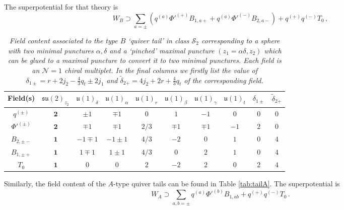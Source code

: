 \documentclass[main.tex]{subfiles}
\begin{document}
The superpotential for that theory is
\begin{equation}
\label{eqn:tailsuperpot}
W_B\supset\sum_{a=\pm}\left(q^{(a)}\Phi'^{(+)}B_{1,a+}+q^{(a)}\Phi'^{(-)}B_{2,a-}\right)+q^{(+)}q^{(-)}T_0\,,
\end{equation}
\begin{table}[ht!]
\centering
\begin{tabular}{|c |c|c|c|c|c|c|c|c| c|} 
 \hline
 Field(s) &$\mathfrak{su}(2)_{z_2}$&$\mathfrak{u}(1)_{\delta}$&$\mathfrak{u}(1)_{\alpha}$&$\mathfrak{u}(1)_{r}$&$\mathfrak{u}(1)_{\beta}$&$\mathfrak{u}(1)_{\gamma}$&$\mathfrak{u}(1)_{t}$&$\delta_{1\pm}$&$\widetilde{\delta}_{2\dot+}$\\[2pt] 
  \hline\hline
$q^{(\pm)}$&$\mathbf{2}$&$\pm1$&$\mp1$&$0$&$1$&$-1$&$0$&$0$&$0$\\
$\Phi'^{(\pm)}$&$\mathbf{2}$&$\mp1$&$\mp1$&$2/3$&$\mp1$&$\mp1$&$-1$&$2$&$0$\\
$B_{2,\pm-}$&$\mathbf{1}$&$-1\mp1$&$-1\pm1$&$4/3$&$-2$&$0$&$1$&$0$&$4$ \\
$B_{1,\pm+}$&$\mathbf{1}$&$1\mp1$&$1\pm1$&$4/3$&$0$&$2$&$1$&$0$ &$4$\\
$T_0$&$\mathbf{1}$&$0$&$0$&$2$&$-2$&$2$&$0$&$2$&$4$\\\hline
\end{tabular}
\caption{\textit{Field content associated to the type $B$ `quiver tail' in class $\mathcal{S}_2$ corresponding to a sphere with two minimal punctures $\alpha,\delta$ and a `pinched' maximal puncture $(z_1=\alpha\delta,z_2)$ which can be glued to a maximal puncture to convert it to two minimal punctures. Each field is an $\mathcal{N}=1$ chiral multiplet. In the final columns we firstly list the value of $\delta_{1\pm}=r+2j_2-\frac{4}{3}q_t\pm 2j_1$ and $\widetilde{\delta}_{2\dot+}=4j_2+2r+\frac{4}{3}q_t$ of the corresponding field.}}
\label{tab:tailB}
\end{table}
Similarly, the field content of the $A$-type quiver tails can be found in Table \ref{tab:tailA}. The superpotential is
\begin{equation}
W_A\supset\sum_{a,b=\pm}q^{(a)}\Phi'^{(b)}B_{1,ab}+q^{(+)}q^{(-)}T_0\,.
\end{equation}
\end{document}

